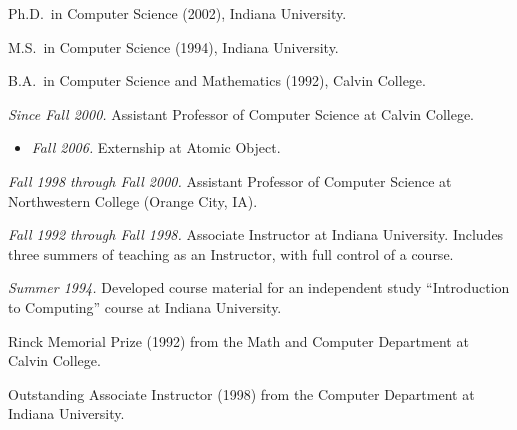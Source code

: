 \documentclass[ComputerScience]{vita}
\begin{document}
\begin{vita}



\begin{Degrees}
\item Ph.D.\ in Computer Science (2002), Indiana University.
\item M.S.\ in Computer Science (1994), Indiana University.
\item B.A.\ in Computer Science and Mathematics (1992), Calvin College.
\end{Degrees}




\begin{Experience}

\item \emph{Since Fall 2000.}  Assistant Professor of Computer
  Science at Calvin College.
  \begin{itemize}
  \item \emph{Fall 2006.}  Externship at Atomic Object.
  \end{itemize}

\item \emph{Fall 1998 through Fall 2000.}  Assistant Professor of
  Computer Science at Northwestern College (Orange City, IA).

\item \emph{Fall 1992 through Fall 1998.}  Associate Instructor at
  Indiana University.  Includes three summers of teaching as an
  Instructor, with full control of a course.

\item \emph{Summer 1994.}  Developed course material for an
  independent study ``Introduction to Computing'' course at Indiana
  University.

\end{Experience}




\begin{Honors}

\item Rinck Memorial Prize (1992) from the Math and Computer
  Department at Calvin College.

\item Outstanding Associate Instructor (1998) from the Computer
  Department at Indiana University.

\end{Honors}



\end{vita}
\end{document}
